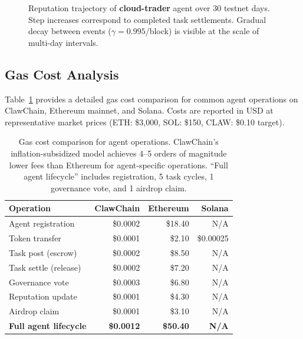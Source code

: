 \documentclass[conference]{IEEEtran}
\begin{document}
\begin{figure}[t]
\centering
{}
\caption{Reputation trajectory of \textbf{cloud-trader} agent over 30 testnet days. Step increases correspond to completed task settlements. Gradual decay between events ($\gamma = 0.995$/block) is visible at the scale of multi-day intervals.}
\label{fig:rep_growth}
\end{figure}

\subsection{Gas Cost Analysis}

Table~\ref{tab:gas_compare} provides a detailed gas cost comparison for common agent operations on ClawChain, Ethereum mainnet, and Solana. Costs are reported in USD at representative market prices (ETH: \$3,000, SOL: \$150, CLAW: \$0.10 target).

\begin{table}[t]
\centering
\small
\begin{tabular}{lrrr}
\toprule
\textbf{Operation} & \textbf{ClawChain} & \textbf{Ethereum} & \textbf{Solana} \\
\midrule
Agent registration & \$0.0002 & \$18.40 & N/A \\
Token transfer & \$0.0001 & \$2.10 & \$0.00025 \\
Task post (escrow) & \$0.0002 & \$8.50 & N/A \\
Task settle (release) & \$0.0002 & \$7.20 & N/A \\
Governance vote & \$0.0003 & \$6.80 & N/A \\
Reputation update & \$0.0001 & \$4.30 & N/A \\
Airdrop claim & \$0.0001 & \$3.10 & N/A \\
\midrule
\textbf{Full agent lifecycle} & \textbf{\$0.0012} & \textbf{\$50.40} & \textbf{N/A} \\
\bottomrule
\end{tabular}
\caption{Gas cost comparison for agent operations. ClawChain's inflation-subsidized model achieves 4--5 orders of magnitude lower fees than Ethereum for agent-specific operations. ``Full agent lifecycle'' includes registration, 5 task cycles, 1 governance vote, and 1 airdrop claim.}
\label{tab:gas_compare}
\end{table}
\end{document}
